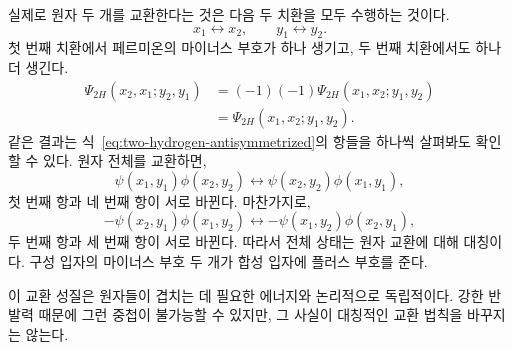 \begin{classroomqa}
\end{classroomqa}

실제로 원자 두 개를 교환한다는 것은 다음 두 치환을 모두 수행하는 것이다.
\begin{equation}
x_1\leftrightarrow x_2,
\qquad
y_1\leftrightarrow y_2.
\end{equation}
첫 번째 치환에서 페르미온의 마이너스 부호가 하나 생기고, 두 번째 치환에서도 하나 더 생긴다.
\begin{equation}
\begin{aligned}
\Psi_{2H}(x_2,x_1;y_2,y_1)
&=(-1)(-1)\Psi_{2H}(x_1,x_2;y_1,y_2)\\
&=\Psi_{2H}(x_1,x_2;y_1,y_2).
\end{aligned}
\end{equation}같은 결과는 식~\eqref{eq:two-hydrogen-antisymmetrized}의 항들을 하나씩 살펴봐도 확인할 수 있다. 원자 전체를 교환하면,
\begin{equation}
\psi(x_1,y_1)\phi(x_2,y_2)
\longleftrightarrow
\psi(x_2,y_2)\phi(x_1,y_1),
\end{equation}
첫 번째 항과 네 번째 항이 서로 바뀐다. 마찬가지로,
\begin{equation}
-\psi(x_2,y_1)\phi(x_1,y_2)
\longleftrightarrow
-\psi(x_1,y_2)\phi(x_2,y_1),
\end{equation}
두 번째 항과 세 번째 항이 서로 바뀐다. 따라서 전체 상태는 원자 교환에 대해 대칭이다. 구성 입자의 마이너스 부호 두 개가 합성 입자에 플러스 부호를 준다.

이 교환 성질은 원자들이 겹치는 데 필요한 에너지와 논리적으로 독립적이다. 강한 반발력 때문에 그런 중첩이 불가능할 수 있지만, 그 사실이 대칭적인 교환 법칙을 바꾸지는 않는다.

\begin{classroomqa}
\end{classroomqa}

